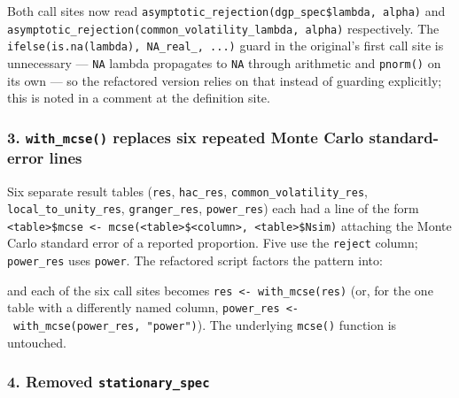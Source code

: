 \documentclass[
  letterpaper,
  DIV=11,
  numbers=noendperiod]{scrartcl}
\newenvironment{Shaded}{\begin{snugshade}}{\end{snugshade}}
\newcommand{\AttributeTok}[1]{\textcolor[rgb]{0.40,0.45,0.13}{#1}}
\newcommand{\ControlFlowTok}[1]{\textcolor[rgb]{0.00,0.23,0.31}{\textbf{#1}}}
\newcommand{\FunctionTok}[1]{\textcolor[rgb]{0.28,0.35,0.67}{#1}}
\newcommand{\NormalTok}[1]{\textcolor[rgb]{0.00,0.23,0.31}{#1}}
\newcommand{\OtherTok}[1]{\textcolor[rgb]{0.00,0.23,0.31}{#1}}
\newcommand{\SpecialCharTok}[1]{\textcolor[rgb]{0.37,0.37,0.37}{#1}}
\newcommand{\StringTok}[1]{\textcolor[rgb]{0.13,0.47,0.30}{#1}}
\begin{document}
Both call sites now read
\texttt{asymptotic\_rejection(dgp\_spec\$lambda,\ alpha)} and
\texttt{asymptotic\_rejection(common\_volatility\_lambda,\ alpha)}
respectively. The \texttt{ifelse(is.na(lambda),\ NA\_real\_,\ ...)}
guard in the original's first call site is unnecessary --- \texttt{NA}
lambda propagates to \texttt{NA} through arithmetic and \texttt{pnorm()}
on its own --- so the refactored version relies on that instead of
guarding explicitly; this is noted in a comment at the definition site.

\subsubsection{\texorpdfstring{3. \texttt{with\_mcse()} replaces six
repeated Monte Carlo standard-error
lines}{3. with\_mcse() replaces six repeated Monte Carlo standard-error lines}}\label{with_mcse-replaces-six-repeated-monte-carlo-standard-error-lines}

Six separate result tables (\texttt{res}, \texttt{hac\_res},
\texttt{common\_volatility\_res}, \texttt{local\_to\_unity\_res},
\texttt{granger\_res}, \texttt{power\_res}) each had a line of the form
\texttt{\textless{}table\textgreater{}\$mcse\ \textless{}-\ mcse(\textless{}table\textgreater{}\$\textless{}column\textgreater{},\ \textless{}table\textgreater{}\$Nsim)}
attaching the Monte Carlo standard error of a reported proportion. Five
use the \texttt{reject} column; \texttt{power\_res} uses \texttt{power}.
The refactored script factors the pattern into:

\begin{Shaded}
\end{Shaded}

and each of the six call sites becomes
\texttt{res\ \textless{}-\ with\_mcse(res)} (or, for the one table with
a differently named column,
\texttt{power\_res\ \textless{}-\ with\_mcse(power\_res,\ "power")}).
The underlying \texttt{mcse()} function is untouched.

\subsubsection{\texorpdfstring{4. Removed
\texttt{stationary\_spec}}{4. Removed stationary\_spec}}\label{removed-stationary_spec}
\end{document}
